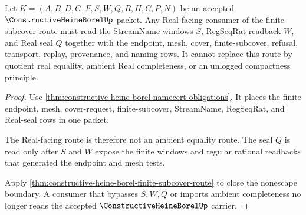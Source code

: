 \begin{theorem}
\label{thm:constructive-heine-borel-real-seal-nonescape}
Let $K=(A,B,D,G,F,S,W,Q,R,H,C,P,N)$ be an accepted $\ConstructiveHeineBorelUp$ packet. Any Real-facing consumer of the finite-subcover route must read the StreamName windows $S$, RegSeqRat readback $W$, and Real seal $Q$ together with the endpoint, mesh, cover, finite-subcover, refusal, transport, replay, provenance, and naming rows. It cannot replace this route by quotient real equality, ambient Real completeness, or an unlogged compactness principle.
\end{theorem}
\begin{proof}
Use \autoref{thm:constructive-heine-borel-namecert-obligations}. It places the finite endpoint, mesh, cover-request, finite-subcover, StreamName, RegSeqRat, and Real-seal rows in one packet.

The Real-facing route is therefore not an ambient equality route. The seal $Q$ is read only after $S$ and $W$ expose the finite windows and regular rational readbacks that generated the endpoint and mesh tests.

Apply \autoref{thm:constructive-heine-borel-finite-subcover-route} to close the nonescape boundary. A consumer that bypasses $S,W,Q$ or imports ambient completeness no longer reads the accepted $\ConstructiveHeineBorelUp$ carrier.
\end{proof}

